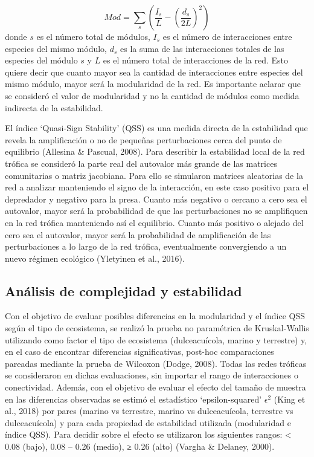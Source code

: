 \documentclass[
]{article}
\begin{document}
\[
Mod = \sum_{s} (\frac{I_s} {L} - (\frac{d_s}{2L})^2)
\] donde \(s\) es el número total de módulos, \(I_s\) es el número de
interacciones entre especies del mismo módulo, \(d_s\) es la suma de las
interacciones totales de las especies del módulo \(s\) y \(L\) es el
número total de interacciones de la red. Esto quiere decir que cuanto
mayor sea la cantidad de interacciones entre especies del mismo módulo,
mayor será la modularidad de la red. Es importante aclarar que se
consideró el valor de modularidad y no la cantidad de módulos como
medida indirecta de la estabilidad.

El índice `Quasi-Sign Stability' (QSS) es una medida directa de la
estabilidad que revela la amplificación o no de pequeñas perturbaciones
cerca del punto de equilibrio (Allesina \& Pascual, 2008). Para
describir la estabilidad local de la red trófica se consideró la parte
real del autovalor más grande de las matrices comunitarias o matriz
jacobiana. Para ello se simularon matrices aleatorias de la red a
analizar manteniendo el signo de la interacción, en este caso positivo
para el depredador y negativo para la presa. Cuanto más negativo o
cercano a cero sea el autovalor, mayor será la probabilidad de que las
perturbaciones no se amplifiquen en la red trófica manteniendo así el
equilibrio. Cuanto más positivo o alejado del cero sea el autovalor,
mayor será la probabilidad de amplificación de las perturbaciones a lo
largo de la red trófica, eventualmente convergiendo a un nuevo régimen
ecológico (Yletyinen et al., 2016).

\hypertarget{anuxe1lisis-de-complejidad-y-estabilidad}{%
\subsection{Análisis de complejidad y
estabilidad}\label{anuxe1lisis-de-complejidad-y-estabilidad}}

Con el objetivo de evaluar posibles diferencias en la modularidad y el
índice QSS según el tipo de ecosistema, se realizó la prueba no
paramétrica de Kruskal-Wallis utilizando como factor el tipo de
ecosistema (dulceacuícola, marino y terrestre) y, en el caso de
encontrar diferencias significativas, post-hoc comparaciones pareadas
mediante la prueba de Wilcoxon (Dodge, 2008). Todas las redes tróficas
se consideraron en dichas evaluaciones, sin importar el rango de
interacciones o conectividad. Además, con el objetivo de evaluar el
efecto del tamaño de muestra en las diferencias observadas se estimó el
estadístico `epsilon-squared' \({\epsilon}^2\) (King et al., 2018) por
pares (marino vs terrestre, marino vs dulceacuícola, terrestre vs
dulceacuícola) y para cada propiedad de estabilidad utilizada
(modularidad e índice QSS). Para decidir sobre el efecto se utilizaron
los siguientes rangos: \textless{} 0.08 (bajo), 0.08 -- 0.26 (medio), ≥
0.26 (alto) (Vargha \& Delaney, 2000).
\end{document}
